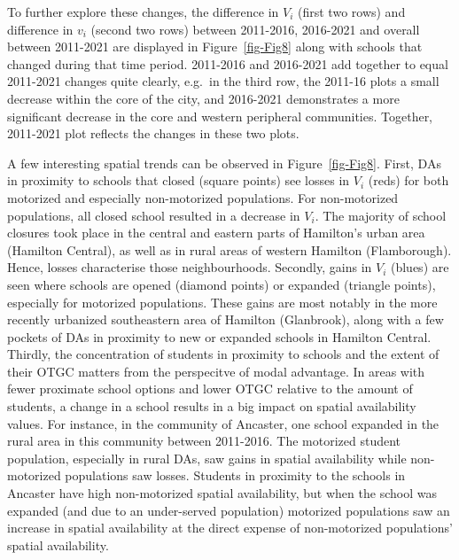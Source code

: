 \documentclass[
default
]{sn-jnl}
\begin{document}
To further explore these changes, the difference in \(V_i\) (first two
rows) and difference in \(v_i\) (second two rows) between 2011-2016,
2016-2021 and overall between 2011-2021 are displayed in
Figure~\ref{fig-Fig8} along with schools that changed during that time
period. 2011-2016 and 2016-2021 add together to equal 2011-2021 changes
quite clearly, e.g.~in the third row, the 2011-16 plots a small decrease
within the core of the city, and 2016-2021 demonstrates a more
significant decrease in the core and western peripheral communities.
Together, 2011-2021 plot reflects the changes in these two plots.

A few interesting spatial trends can be observed in
Figure~\ref{fig-Fig8}. First, DAs in proximity to schools that closed
(square points) see losses in \(V_i\) (reds) for both motorized and
especially non-motorized populations. For non-motorized populations, all
closed school resulted in a decrease in \(V_i\). The majority of school
closures took place in the central and eastern parts of Hamilton's urban
area (Hamilton Central), as well as in rural areas of western Hamilton
(Flamborough). Hence, losses characterise those neighbourhoods.
Secondly, gains in \(V_i\) (blues) are seen where schools are opened
(diamond points) or expanded (triangle points), especially for motorized
populations. These gains are most notably in the more recently urbanized
southeastern area of Hamilton (Glanbrook), along with a few pockets of
DAs in proximity to new or expanded schools in Hamilton Central.
Thirdly, the concentration of students in proximity to schools and the
extent of their OTGC matters from the perspecitve of modal advantage. In
areas with fewer proximate school options and lower OTGC relative to the
amount of students, a change in a school results in a big impact on
spatial availability values. For instance, in the community of Ancaster,
one school expanded in the rural area in this community between
2011-2016. The motorized student population, especially in rural DAs,
saw gains in spatial availability while non-motorized populations saw
losses. Students in proximity to the schools in Ancaster have high
non-motorized spatial availability, but when the school was expanded
(and due to an under-served population) motorized populations saw an
increase in spatial availability at the direct expense of non-motorized
populations' spatial availability.
\end{document}
